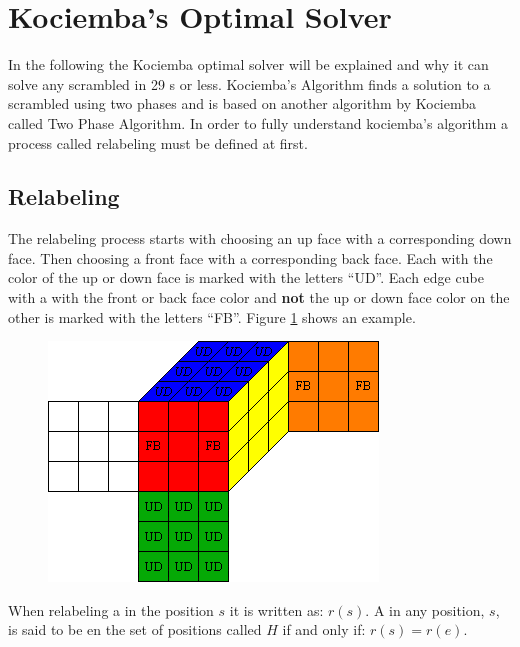 \section{Kociemba's Optimal Solver}
In the following the Kociemba optimal solver\cite{kociemba09} will be explained and why it can solve any scrambled \rubik{} in 29 \twist{}s or less. Kociemba's Algorithm finds a solution to a scrambled \rubik{} using two phases and is based on another algorithm by Kociemba called Two Phase Algorithm. In order to fully understand kociemba's algorithm a process called relabeling must be  defined at first. 

\subsection{Relabeling}
The relabeling process  starts with choosing an up face with a corresponding down face. Then choosing a front face with a corresponding back face. Each \facelet{} with the color of the up or down face is marked with the letters ``UD''. Each edge cube with a \facelet{} with the front or back face color and \textbf{not} the up or down face color on the other \facelet{} is marked with the letters ``FB''. Figure \ref{fig:relabelClean} shows an example.

\begin{figure}[hb]
	\centering
		\includegraphics[scale = 0.8]{input/pics/relabelClean}
	\caption{}
	\label{fig:relabelClean}
\end{figure}

When relabeling a \rubik{} in the position $s$ it is written as: $r(s)$. A \rubik{} in any position, $s$, is said to be en the set of positions called $H$ if and only if: $r(s)=r(e)$.


